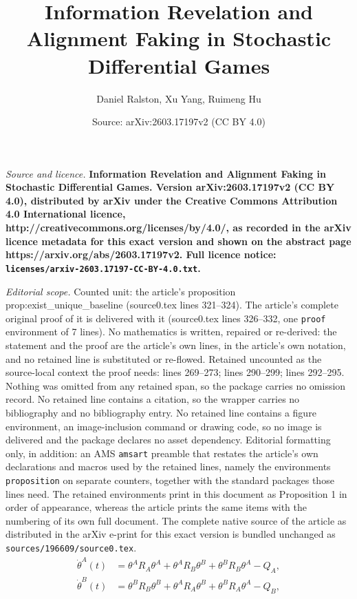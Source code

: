 \documentclass[10pt,a4paper]{amsart}
\title{\LARGE \bf Information Revelation and Alignment Faking in Stochastic Differential Games}
\author{Daniel Ralston, Xu Yang, Ruimeng Hu}
\date{Source: arXiv:2603.17197v2 (CC BY 4.0)}
\begin{document}
\maketitle

\noindent\emph{Source and licence.} \LARGE \bf Information Revelation and Alignment Faking in Stochastic Differential Games. Version arXiv:2603.17197v2 (CC BY 4.0), distributed by arXiv under the Creative Commons Attribution 4.0 International licence, http://creativecommons.org/licenses/by/4.0/, as recorded in the arXiv licence metadata for this exact version and shown on the abstract page https://arxiv.org/abs/2603.17197v2. Full licence notice: \texttt{licenses/arxiv-2603.17197-CC-BY-4.0.txt}.\par\smallskip

\noindent\textit{Editorial scope.} Counted unit: the article's proposition prop:exist\_unique\_baseline (source0.tex lines 321--324). The article's complete original proof of it is delivered with it (source0.tex lines 326--332, one \texttt{proof} environment of 7 lines). No mathematics is written, repaired or re-derived: the statement and the proof are the article's own lines, in the article's own notation, and no retained line is substituted or re-flowed.  Retained uncounted as the source-local context the proof needs: lines 269--273; lines 290--299; lines 292--295.  Nothing was omitted from any retained span, so the package carries no omission record.  No retained line contains a citation, so the wrapper carries no bibliography and no bibliography entry.  No retained line contains a figure environment, an image-inclusion command or drawing code, so no image is delivered and the package declares no asset dependency.  Editorial formatting only, in addition: an AMS \texttt{amsart} preamble that restates the article's own declarations and macros used by the retained lines, namely the environments \texttt{proposition} on separate counters, together with the standard packages those lines need.  The retained environments print in this document as Proposition 1 in order of appearance, whereas the article prints the same items with the numbering of its own full document.  The complete native source of the article as distributed in the arXiv e-print for this exact version is bundled unchanged as \texttt{sources/196609/source0.tex}.
\begin{align}\label{eq:Riccati_A}
    \dot{\theta}^A(t) &= \theta^A R_A \theta^A + \theta^A R_B \theta^B + \theta^B R_B \theta^A - Q_A, \\
    \label{eq:Riccati_B}
    \dot{\theta}^B(t) &= \theta^B R_B \theta^B + \theta^A R_A \theta^B + \theta^B R_A \theta^A - Q_B,
\end{align}
\end{document}
